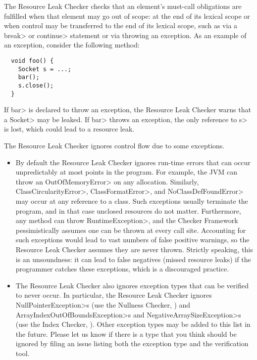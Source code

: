 


The Resource Leak Checker checks that an element's must-call obligations
are fulfilled when that element may go out of scope: at the end of its
lexical scope or when control may be transferred to the end of its lexical
scope, such as via a \<break> or \<continue> statement or via throwing an
exception.  As an example of an exception, consider the following method:

\begin{verbatim}
  void foo() {
    Socket s = ...;
    bar();
    s.close();
  }
\end{verbatim}

If \<bar> is declared to throw an exception, the Resource Leak Checker
warns that a \<Socket> may be leaked.  If \<bar> throws an exception, the
only reference to \<s> is lost, which could lead to a resource leak.

The Resource Leak Checker ignores control flow due to some exceptions.

\begin{itemize}
\item
By default the Resource Leak Checker ignores run-time errors that can occur
unpredictably at most points in the program. For example, the JVM can throw
an \<OutOfMemoryError> on any allocation.  Similarly,
\<ClassCircularityError>, \<ClassFormatError>, and \<NoClassDefFoundError>
may occur at any reference to a class.  Such exceptions usually terminate
the program, and in that case unclosed resources do not matter.
Furthermore, any method can throw \<RuntimeException>, and the Checker
Framework pessimistically assumes one can be thrown at every call site.
Accounting for such exceptions would lead to vast numbers of
false positive warnings, so the Resource Leak Checker assumes they are
never thrown.  Strictly speaking, this is an unsoundness:  it can lead to
false negatives (missed resource leaks) if the programmer catches these
exceptions, which is a discouraged practice.

\item
The Resource Leak Checker also ignores exception types that can be verified
to never occur.  In particular, the Resource Leak Checker ignores \<NullPointerException>s
(use the Nullness Checker, ) and
\<ArrayIndexOutOfBoundsException>s and \<NegativeArraySizeException>s (use the Index
Checker, ). Other exception types may be added to this
list in the future.  Please let us know if there is a type that you think should
be ignored by filing an issue listing both the exception type and the
verification tool.
\end{itemize}

